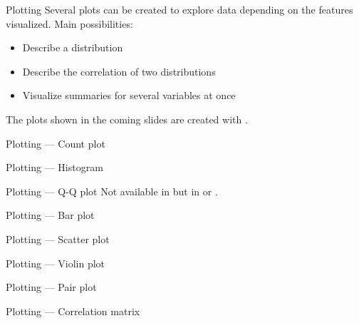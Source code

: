 \begin{frame}{Plotting}
  Several plots can be created to explore data depending on the features visualized. Main possibilities:

  \begin{itemize}
  \item Describe a distribution
  \item Describe the correlation of two distributions
  \item Visualize summaries for several variables at once
  \end{itemize}
  The plots shown in the coming slides are created with
  .
\end{frame}

\begin{frame}{Plotting — Count plot}
\end{frame}

\begin{frame}{Plotting — Histogram}
\end{frame}

\begin{frame}{Plotting — Q-Q plot}
  Not available in 
  but in
  or
  .
\end{frame}

\begin{frame}{Plotting — Bar plot}
\end{frame}

\begin{frame}{Plotting — Scatter plot}
\end{frame}

\begin{frame}{Plotting — Violin plot}
\end{frame}

\begin{frame}{Plotting — Pair plot}
\end{frame}

\begin{frame}{Plotting — Correlation matrix}
\end{frame}

